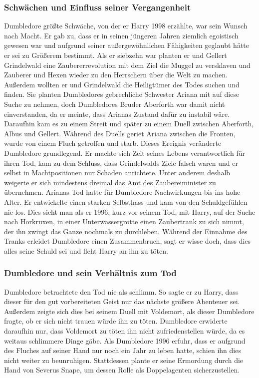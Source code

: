 \documentclass[a4paper, 10pt]{article}
\begin{document}
\subsubsection*{\large Schwächen und Einfluss seiner Vergangenheit}
Dumbledore größte Schwäche, von der er Harry 1998 erzählte, war sein Wunsch nach Macht. Er gab zu, dass er in seinen jüngeren Jahren ziemlich egoistisch gewesen war und aufgrund seiner außergewöhnlichen Fähigkeiten geglaubt hätte er sei zu Größerem bestimmt. Als er siebzehn war planten er und Gellert Grindelwald eine Zaubererrevolution mit dem Ziel die Muggel zu versklaven und Zauberer und Hexen wieder zu den Herrschern über die Welt zu machen. Außerdem wollten er und Grindelwald die Heiligtümer des Todes suchen und finden. Sie planten Dumbledores gebrechliche Schwester Ariana mit auf diese
Suche zu nehmen, doch Dumbledores Bruder Aberforth war damit nicht einverstanden, da er meinte, dass Arianas Zustand dafür zu instabil wäre. Daraufhin kam es zu einem Streit und später zu einem Duell zwischen Aberforth, Albus und Gellert. Während des Duells geriet Ariana zwischen die Fronten, wurde von einem Fluch getroffen und starb. Dieses Ereignis veränderte Dumbledore grundlegend. Er machte sich Zeit seines Lebens verantwortlich für ihren Tod, kam zu dem Schluss, dass Grindelwalds Ziele falsch waren und er selbst in Machtpositionen nur Schaden anrichtete. Unter anderem deshalb weigerte er sich mindestens dreimal das Amt des Zaubereiminister zu übernehmen.
\vspace{10pt}
\newline
{}  
Arianas Tod hatte für Dumbledore Nachwirkungen bis ins hohe Alter. Er entwickelte einen starken Selbsthass und kam von den Schuldgefühlen nie los. Dies sieht man als er 1996, kurz vor seinem Tod, mit Harry, auf der Suche nach Horkruxen, in einer Unterwassergrotte einen Zaubertrank zu sich nimmt, der ihn zwingt das Ganze nochmals zu durchleben. Während der Einnahme des Tranks erleidet Dumbledore einen Zusammenbruch, sagt er wisse doch, dass dies alles seine Schuld sei und fleht Harry an ihn zu töten.
\subsubsection*{\large Dumbledore und sein Verhältnis zum Tod}
Dumbledore betrachtete den Tod nie als schlimm. So sagte er zu Harry, dass dieser für den gut vorbereiteten Geist nur das nächste größere Abenteuer sei. Außerdem zeigte sich dies bei seinem Duell mit Voldemort, als dieser Dumbledore fragte, ob er sich nicht trauen würde ihn zu töten. Dumbledore erwiderte daraufhin nur, dass Voldemort zu töten ihn nicht zufriedenstellen würde, da es weitaus schlimmere Dinge gäbe. Als Dumbledore 1996 erfuhr, dass er aufgrund des Fluches auf seiner Hand nur noch ein Jahr zu leben hatte, schien ihn dies nicht weiter zu beunruhigen. Stattdessen plante er seine Ermordung durch die Hand von Severus Snape, um dessen Rolle als Doppelagenten sicherzustellen.
\end{document}
